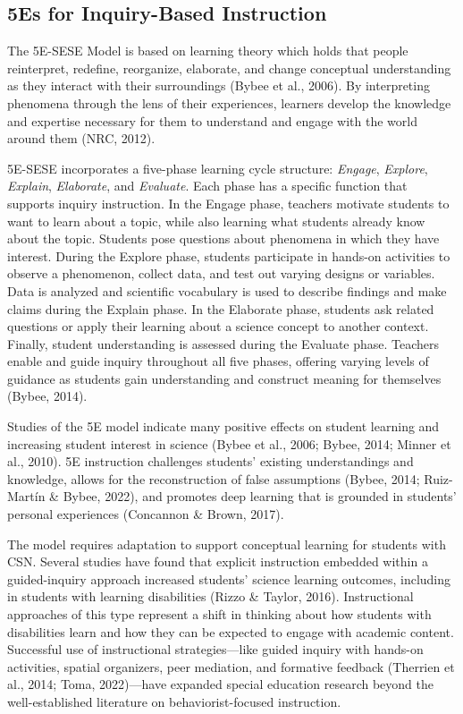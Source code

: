 \documentclass[11.5pt]{sig-alternate} %
\begin{document}
\begin{large}
\subsection*{5Es for Inquiry-Based Instruction}

The 5E-SESE Model is based on learning theory which holds that people reinterpret, redefine, reorganize, elaborate, and change conceptual understanding as they interact with their surroundings (Bybee et al., 2006). By interpreting phenomena through the lens of their experiences, learners develop the knowledge and expertise necessary for them to understand and engage with the world around them (NRC, 2012).

5E-SESE incorporates a five-phase learning cycle structure: \textit{Engage}, \textit{Explore}, \textit{Explain}, \textit{Elaborate}, and \textit{Evaluate}. Each phase has a specific function that supports inquiry instruction. In the Engage phase, teachers motivate students to want to learn about a topic, while also learning what students already know about the topic. Students pose questions about phenomena in which they have interest. During the Explore phase, students participate in hands-on activities to observe a phenomenon, collect data, and test out varying designs or variables. Data is analyzed and scientific vocabulary is used to describe findings and make claims during the Explain phase. In the Elaborate phase, students ask related questions or apply their learning about a science concept to another context. Finally, student understanding is assessed during the Evaluate phase. Teachers enable and guide inquiry throughout all five phases, offering varying levels of guidance as students gain understanding and construct meaning for themselves (Bybee, 2014). 

Studies of the 5E model indicate many positive effects on student learning and increasing student interest in science (Bybee et al., 2006; Bybee, 2014; Minner et al., 2010). 5E instruction challenges students’ existing understandings and knowledge, allows for the reconstruction of false assumptions (Bybee, 2014; Ruiz-Martín \& Bybee, 2022), and promotes deep learning that is grounded in students’ personal experiences (Concannon \& Brown, 2017).

The model requires adaptation to support conceptual learning for students with CSN. Several studies have found that explicit instruction embedded within a guided-inquiry approach increased students’ science learning outcomes, including in students with learning disabilities (Rizzo \& Taylor, 2016). Instructional approaches of this type represent a shift in thinking about how students with disabilities learn and how they can be expected to engage with academic content. Successful use of instructional strategies—like guided inquiry with hands-on activities, spatial organizers, peer mediation, and formative feedback (Therrien et al., 2014; Toma, 2022)—have expanded special education research beyond the well-established literature on behavior\-ist-focused instruction.


\end{large}
\end{document}

